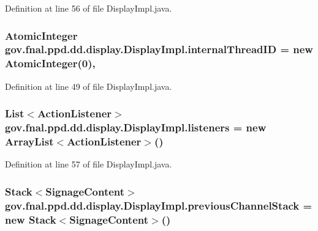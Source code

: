 Definition at line 56 of file Display\-Impl.\-java.

\hypertarget{classgov_1_1fnal_1_1ppd_1_1dd_1_1display_1_1DisplayImpl_ad88d25a9ab5f40882542b19846f83bf3}{
\subsubsection[{internal\-Thread\-I\-D}]{\setlength{\rightskip}{0pt plus 5cm}Atomic\-Integer gov.\-fnal.\-ppd.\-dd.\-display.\-Display\-Impl.\-internal\-Thread\-I\-D = new Atomic\-Integer(0)\hspace{0.3cm}{\ttfamily [static]}, {\ttfamily [protected]}}}\label{classgov_1_1fnal_1_1ppd_1_1dd_1_1display_1_1DisplayImpl_ad88d25a9ab5f40882542b19846f83bf3}


Definition at line 49 of file Display\-Impl.\-java.

\hypertarget{classgov_1_1fnal_1_1ppd_1_1dd_1_1display_1_1DisplayImpl_aa4a7dad0a486d2f888cf47921423e2c1}{
\subsubsection[{listeners}]{\setlength{\rightskip}{0pt plus 5cm}List$<$Action\-Listener$>$ gov.\-fnal.\-ppd.\-dd.\-display.\-Display\-Impl.\-listeners = new Array\-List$<$Action\-Listener$>$()\hspace{0.3cm}{\ttfamily [protected]}}}\label{classgov_1_1fnal_1_1ppd_1_1dd_1_1display_1_1DisplayImpl_aa4a7dad0a486d2f888cf47921423e2c1}


Definition at line 57 of file Display\-Impl.\-java.

\hypertarget{classgov_1_1fnal_1_1ppd_1_1dd_1_1display_1_1DisplayImpl_a1732d577755dfc58b9762a41599fa4ed}{
\subsubsection[{previous\-Channel\-Stack}]{\setlength{\rightskip}{0pt plus 5cm}Stack$<${\bf Signage\-Content}$>$ gov.\-fnal.\-ppd.\-dd.\-display.\-Display\-Impl.\-previous\-Channel\-Stack = new Stack$<${\bf Signage\-Content}$>$()\hspace{0.3cm}{\ttfamily [protected]}}}\label{classgov_1_1fnal_1_1ppd_1_1dd_1_1display_1_1DisplayImpl_a1732d577755dfc58b9762a41599fa4ed}


